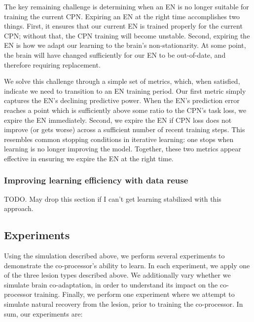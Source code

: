 \documentclass[12pt]{iopart}
\begin{document}
The key remaining challenge is determining when an EN is no longer suitable for training the
current CPN. Expiring an EN at the right time accomplishes two things. First, it ensures
that our current EN is trained properly for the current CPN; without that, the CPN training
will become unstable. Second, expiring the EN is how we adapt our learning to the brain's
non-stationarity. At some point, the brain will have changed sufficiently for our EN to be
out-of-date, and therefore requiring replacement.

We solve this challenge through a simple set of metrics, which, when satisfied, indicate
we need to transition to an EN training period. Our first metric simply captures the EN's
declining predictive power. When the EN's prediction error reaches a point which is
sufficiently above some ratio to the CPN's task loss, we expire the EN immediately.
Second, we expire the EN if CPN loss does not improve (or gets worse) across a sufficient
number of recent training steps. This resembles common stopping conditions in
iterative learning: one stops when learning is no longer improving the model. Together,
these two metrics appear effective in ensuring we expire the EN at the right time.

\subsubsection{Improving learning efficiency with data reuse}
TODO. May drop this section if I can't get learning stabilized with this approach.

\subsection{Experiments}
\label{sec:experiments}

Using the simulation described above, we perform several experiments to
demonstrate the co-processor's ability to learn. In each experiment, we apply one
of the three lesion types described above. We additionally vary whether we simulate
brain co-adaptation, in order to understand its impact on the co-processor training.
Finally, we perform one experiment where we attempt to simulate natural recovery from
the lesion, prior to training the co-processor. In sum, our experiments are: \\
\end{document}
